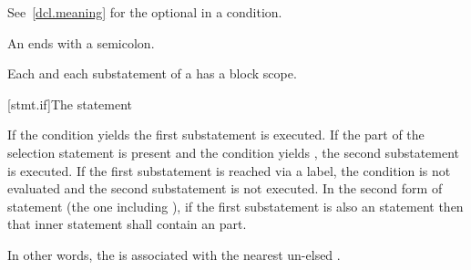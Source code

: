 See~\ref{dcl.meaning} for the optional  in a condition.
\begin{note}
An  ends with a semicolon.
\end{note}

\pnum
{}%
\begin{note}
Each  and
each substatement of a 
has a block scope.
\end{note}

[stmt.if]{The  statement}%

\pnum
If the condition yields  the first
substatement is executed. If the  part of the selection
statement is present and the condition yields , the second
substatement is executed. If the first substatement is reached via a
label, the condition is not evaluated and the second substatement is
not executed. In the second form of  statement
(the one including ), if the first substatement is also an
 statement then that inner  statement shall contain
an  part.
\begin{footnote}
In other words, the  is associated with the nearest un-elsed
.
\end{footnote}


